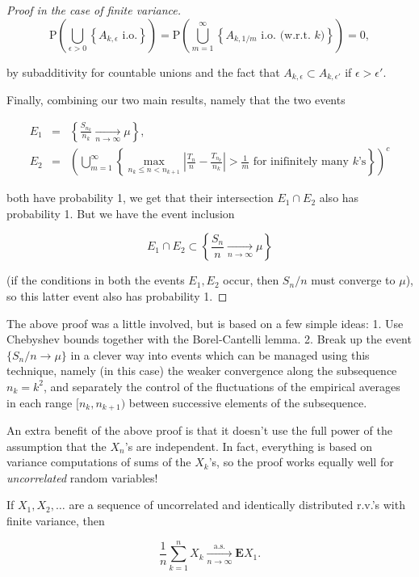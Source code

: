 \begin{proof}[Proof in the case of finite variance]
\[
\mathrm{P}\left(\bigcup_{\epsilon>0} \left\{ A_{k,\epsilon}\textrm{ i.o.} \right\} \right) =
\mathrm{P}\left( \bigcup_{m=1}^\infty \left\{ A_{k,1/m}\textrm{ i.o. (w.r.t. } k \textrm{)}\right\} \right) = 0,
\]

\noindent by subadditivity for countable unions and the fact
that $A_{k,\epsilon} \subset A_{k,\epsilon'}$ if
$\epsilon>\epsilon'$.

Finally, combining our two main results, namely that
the two events

\begin{eqnarray*}
E_1 &=& \left\{ \frac{S_{n_k}}{n_k} \xrightarrow[n\to\infty]{} \mu \right\},
\\
E_2 &=& \left( \bigcup_{m=1}^\infty \left\{
\max_{n_k\le n< n_{k+1}} \left|\frac{T_n}{n}-\frac{T_{n_k}}{n_k} \right| > \frac{1}{m}
\textrm{ for inifinitely many } k \textrm{'s}
\right\}
\right)^c
\end{eqnarray*}

\noindent both have probability 1, we get that their
intersection $E_1\cap E_2$ also has probability 1.
But we have the event inclusion

\[
E_1 \cap E_2 \subset \left\{ \frac{S_n}{n} \xrightarrow[n\to\infty]{} \mu \right\}
\]

\noindent (if the conditions in both the events $E_1, E_2$
occur, then $S_n/n$ must converge to $\mu$), so this
latter event also has probability 1.
\end{proof}

\noindent The above proof was a little involved, but is based
on a few simple ideas: 1. Use Chebyshev bounds
together with the Borel-Cantelli lemma. 2. Break up
the event $\{S_n/n\to \mu\}$ in a clever way into
events which can be managed using this technique,
namely (in this case) the weaker convergence along the
subsequence $n_k = k^2$, and separately the control
of the fluctuations of the empirical averages in each
range $[n_k,n_{k+1})$ between successive elements of
the subsequence.

An extra benefit of the above proof is that it
doesn't use the full power of the assumption that the
$X_n$'s are independent. In fact, everything is based
on variance computations of sums of the $X_k$'s, so
the proof works equally well for \emph{uncorrelated} random
variables!

\begin{thm}
If $X_1,X_2,\ldots$ are a sequence of uncorrelated
and identically distributed r.v.'s with finite
variance, then

\[
\frac{1}{n}\sum_{k=1}^n X_k \xrightarrow[n\to\infty]{\textrm{a.s.}} \mathbf{E} X_1.
\]

\end{thm}

